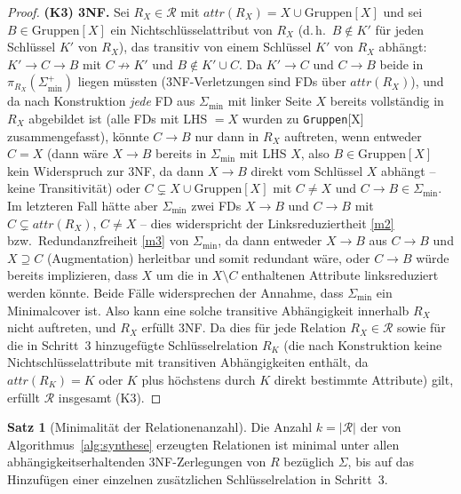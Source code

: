 ﻿\documentclass[a4paper,12pt]{report}
\theoremstyle{definition}
\newtheorem{theorem}{Satz}[chapter]
\theoremstyle{remark}
\newcommand{\att}{\mathit{attr}}
\begin{document}
\begin{proof}
\textbf{(K3) 3NF.}
Sei $R_X\in\mathcal{R}$ mit $\att(R_X)=X\cup\text{Gruppen}[X]$ und sei
$B\in\text{Gruppen}[X]$ ein Nichtschlüsselattribut von $R_X$ (d.\,h.\
$B\notin K'$ für jeden Schlüssel $K'$ von $R_X$), das transitiv von
einem Schlüssel $K'$ von $R_X$ abhängt: $K'\to C\to B$ mit $C\not\to
K'$ und $B\notin K'\cup C$. Da $K'\to C$ und $C\to B$ beide in
$\pi_{R_X}(\Sigma_{\min}^+)$ liegen müssten (3NF-Verletzungen sind FDs
über $\att(R_X)$), und da nach Konstruktion \emph{jede} FD aus
$\Sigma_{\min}$ mit linker Seite $X$ bereits vollständig in $R_X$
abgebildet ist (alle FDs mit LHS $=X$ wurden zu \texttt{Gruppen}[X]
zusammengefasst), könnte $C\to B$ nur dann in $R_X$ auftreten, wenn
entweder $C=X$ (dann wäre $X\to B$ bereits in $\Sigma_{\min}$ mit
LHS $X$, also $B\in\text{Gruppen}[X]$ kein Widerspruch zur
3NF, da dann $X\to B$ direkt vom Schlüssel $X$ abhängt -- keine
Transitivität) oder $C\subsetneq X\cup\text{Gruppen}[X]$ mit $C\neq X$
und $C\to B\in\Sigma_{\min}$. Im letzteren Fall hätte aber
$\Sigma_{\min}$ zwei FDs $X\to B$ und $C\to B$ mit $C\subsetneq
\att(R_X)$, $C\neq X$ -- dies widerspricht der Linksreduziertheit
\ref{m2} bzw.\ Redundanzfreiheit \ref{m3} von $\Sigma_{\min}$, da dann
entweder $X\to B$ aus $C\to B$ und $X\supseteq C$ (Augmentation)
herleitbar und somit redundant wäre, oder $C\to B$ würde bereits
implizieren, dass $X$ um die in $X\setminus C$ enthaltenen Attribute
linksreduziert werden könnte. Beide Fälle widersprechen der Annahme,
dass $\Sigma_{\min}$ ein Minimalcover ist. Also kann eine solche
transitive Abhängigkeit innerhalb $R_X$ nicht auftreten, und $R_X$
erfüllt 3NF. Da dies für jede Relation $R_X\in\mathcal{R}$ sowie für
die in Schritt~3 hinzugefügte Schlüsselrelation $R_K$ (die nach
Konstruktion keine Nichtschlüsselattribute mit transitiven
Abhängigkeiten enthält, da $\att(R_K)=K$ oder $K$ plus höchstens
durch $K$ direkt bestimmte Attribute) gilt, erfüllt $\mathcal{R}$
insgesamt (K3). \qedhere
\end{proof}

\begin{theorem}[Minimalität der Relationenanzahl]
\label{thm:synthese-minimal}
Die Anzahl $k=|\mathcal{R}|$ der von Algorithmus~\ref{alg:synthese}
erzeugten Relationen ist minimal unter allen abhängigkeitserhaltenden
3NF-Zerlegungen von $R$ bezüglich $\Sigma$, bis auf das
Hinzufügen einer einzelnen zusätzlichen Schlüsselrelation in
Schritt~3.
\end{theorem}
\end{document}
